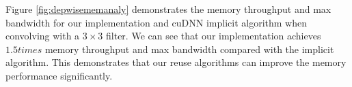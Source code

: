 Figure \ref{fig:depwisememanaly} demonstrates the memory throughput and max bandwidth for our implementation and cuDNN implicit algorithm when convolving with a $3 \times 3$ filter. We can see that our implementation achieves $1.5 times$ memory throughput and max bandwidth compared with the implicit algorithm. This demonstrates that our reuse algorithms can improve the memory performance significantly.


